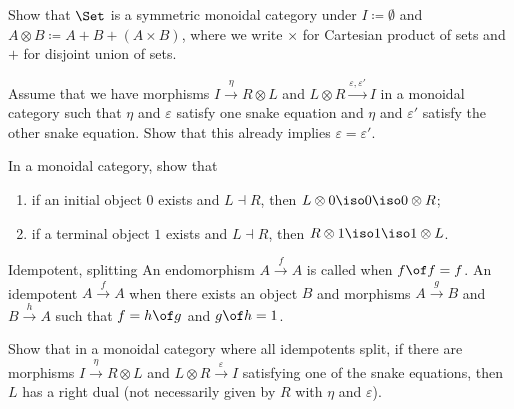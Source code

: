 \begin{exercise}
  Show that $\Set$ is a symmetric monoidal category under $I \coloneqq \emptyset$ and $A \otimes B \coloneqq A + B + (A \times B)$, where we write $\times$ for Cartesian product of sets and $+$ for disjoint union of sets.
\end{exercise}


\begin{exercise}
  Assume that we have morphisms $I \xrightarrow{\eta} R \otimes L$ and $L \otimes R \xrightarrow{\varepsilon, \varepsilon'} I$ in a monoidal category such that $\eta$ and $\varepsilon$ satisfy one snake equation and $\eta$ and $\varepsilon'$ satisfy the other snake equation.
  Show that this already implies $\varepsilon = \varepsilon'$.
\end{exercise}


\begin{exercise}
  In a monoidal category, show that
  \begin{enumerate}
    \item if an initial object $0$ exists and $L \dashv R$, then $L \otimes 0 \iso 0 \iso 0 \otimes R$;
    \item if a terminal object $1$ exists and $L \dashv R$, then $R \otimes 1 \iso 1 \iso 1 \otimes L$.
  \end{enumerate}
\end{exercise}


\begin{definition}{Idempotent, splitting}
  An endomorphism $A \xrightarrow{f} A$ is called  when $f \of f = f$. An idempotent $A \xrightarrow{f} A$  when there exists an object $B$ and morphisms $A \xrightarrow{g} B$ and $B \xrightarrow{h} A$ such that $f = h \of g$ and $g \of h = 1$.
\end{definition}


\begin{exercise}
  Show that in a monoidal category where all idempotents split, if there are morphisms $I \xrightarrow{\eta} R \otimes L$ and $L \otimes R \xrightarrow{\varepsilon} I$ satisfying one of the snake equations, then $L$ has a right dual (not necessarily given by $R$ with $\eta$ and $\varepsilon$).
\end{exercise}




